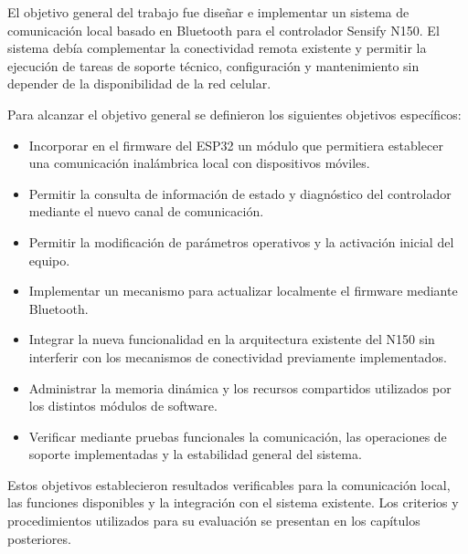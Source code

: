 El objetivo general del trabajo fue diseñar e implementar un sistema de comunicación local basado en Bluetooth para el controlador Sensify N150. El sistema debía complementar la conectividad remota existente y permitir la ejecución de tareas de soporte técnico, configuración y mantenimiento sin depender de la disponibilidad de la red celular.

Para alcanzar el objetivo general se definieron los siguientes objetivos específicos:

\begin{itemize}
	\item Incorporar en el firmware del ESP32 un módulo que permitiera establecer una comunicación inalámbrica local con dispositivos móviles.
	\item Permitir la consulta de información de estado y diagnóstico del controlador mediante el nuevo canal de comunicación.
	\item Permitir la modificación de parámetros operativos y la activación inicial del equipo.
	\item Implementar un mecanismo para actualizar localmente el firmware mediante Bluetooth.
	\item Integrar la nueva funcionalidad en la arquitectura existente del N150 sin interferir con los mecanismos de conectividad previamente implementados.
	\item Administrar la memoria dinámica y los recursos compartidos utilizados por los distintos módulos de software.
	\item Verificar mediante pruebas funcionales la comunicación, las operaciones de soporte implementadas y la estabilidad general del sistema.
\end{itemize}

Estos objetivos establecieron resultados verificables para la comunicación local, las funciones disponibles y la integración con el sistema existente. Los criterios y procedimientos utilizados para su evaluación se presentan en los capítulos posteriores.
